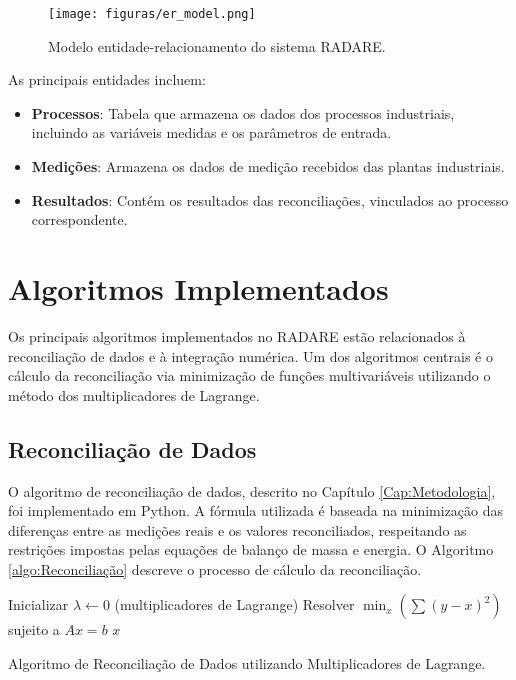 \begin{figure}[htbp]
    \centering
    \texttt{[image: figuras/er\_model.png]}
    \caption{Modelo entidade-relacionamento do sistema RADARE.}
    \label{Fig:ERModel}
\end{figure}

As principais entidades incluem:

\begin{itemize}
    \item \textbf{Processos}: Tabela que armazena os dados dos processos industriais, incluindo as variáveis medidas e os parâmetros de entrada.
    \item \textbf{Medições}: Armazena os dados de medição recebidos das plantas industriais.
    \item \textbf{Resultados}: Contém os resultados das reconciliações, vinculados ao processo correspondente.
\end{itemize}

\section{Algoritmos Implementados}
\label{Sec:AlgoritmosImplementados}

Os principais algoritmos implementados no RADARE estão relacionados à reconciliação de dados e à integração numérica. Um dos algoritmos centrais é o cálculo da reconciliação via minimização de funções multivariáveis utilizando o método dos multiplicadores de Lagrange.

\subsection{Reconciliação de Dados}
\label{Sec:ReconciliaçãoDados}

O algoritmo de reconciliação de dados, descrito no Capítulo \ref{Cap:Metodologia}, foi implementado em Python. A fórmula utilizada é baseada na minimização das diferenças entre as medições reais e os valores reconciliados, respeitando as restrições impostas pelas equações de balanço de massa e energia. O Algoritmo \ref{algo:Reconciliação} descreve o processo de cálculo da reconciliação.

\begin{algorithm}
Inicializar $\lambda \leftarrow 0$ (multiplicadores de Lagrange)\;
Resolver $\min_x \left( \sum (y - x)^2 \right)$ sujeito a $Ax = b$\;
\Retorna $x$\;
\caption{Algoritmo de Reconciliação de Dados utilizando Multiplicadores de Lagrange.}
\label{algo:Reconciliação}
\end{algorithm}

